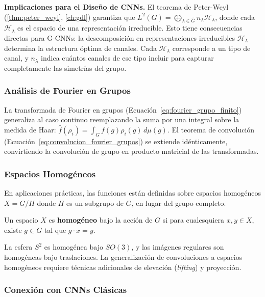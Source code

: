 \textbf{Implicaciones para el Diseño de CNNs.} El teorema de Peter-Weyl (\autoref{thm:peter_weyl}, \autoref{ch:gdl}) garantiza que $L^2(G) = \bigoplus_{\lambda \in \widehat{G}} n_\lambda \mathcal{H}_\lambda$, donde cada $\mathcal{H}_\lambda$ es el espacio de una representación irreducible. Esto tiene consecuencias directas para G-\glspl{CNN}: la descomposición en representaciones irreducibles $\mathcal{H}_\lambda$ determina la estructura óptima de canales. Cada $\mathcal{H}_\lambda$ corresponde a un tipo de canal, y $n_\lambda$ indica cuántos canales de ese tipo incluir para capturar completamente las simetrías del grupo.

\subsubsection{Análisis de Fourier en Grupos}

La transformada de Fourier en grupos (Ecuación~\ref{eq:fourier_grupo_finito}) generaliza al caso continuo reemplazando la suma por una integral sobre la medida de Haar: $\hat{f}(\rho_i) = \int_G f(g) \rho_i(g) \, d\mu(g)$. El teorema de convolución (Ecuación~\ref{eq:convolucion_fourier_grupos}) se extiende idénticamente, convirtiendo la convolución de grupo en producto matricial de las transformadas.

\subsubsection{Espacios Homogéneos}

En aplicaciones prácticas, las funciones están definidas sobre espacios homogéneos $X = G/H$ donde $H$ es un subgrupo de $G$, en lugar del grupo completo.

\begin{definition}
Un espacio $X$ es \textbf{homogéneo} bajo la acción de $G$ si para cualesquiera $x, y \in X$, existe $g \in G$ tal que $g \cdot x = y$.
\end{definition}

La esfera $S^2$ es homogénea bajo $SO(3)$, y las imágenes regulares son homogéneas bajo traslaciones. La generalización de convoluciones a espacios homogéneos requiere técnicas adicionales de elevación (\textit{lifting}) y proyección.

\subsubsection{Conexión con CNNs Clásicas}


